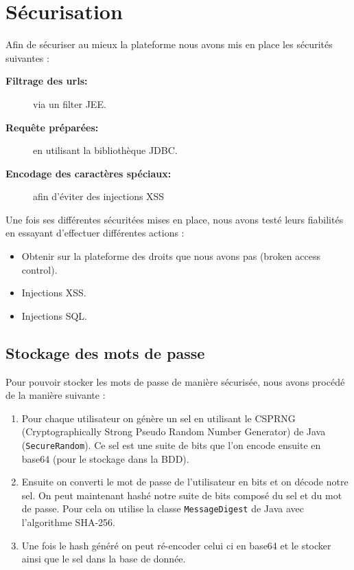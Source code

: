\section{Sécurisation}

Afin de sécuriser au mieux la plateforme nous avons mis en place les sécurités suivantes :
\begin{description}
    \item[\textbf{Filtrage des urls:}] via un filter JEE.
    \item[\textbf{Requête préparées:}] en utilisant la bibliothèque JDBC.
    \item[\textbf{Encodage des caractères spéciaux:}] afin d'éviter des injections XSS
\end{description}
\medskip

Une fois ses différentes sécuritées mises en place, nous avons testé leurs fiabilités en essayant
d'effectuer différentes actions :
\begin{itemize}
    \item Obtenir sur la plateforme des droits que nous avons pas (broken access control).
    \item Injections XSS.
    \item Injections SQL.
\end{itemize}
\newpage

\subsection{Stockage des mots de passe}

Pour pouvoir stocker les mots de passe de manière sécurisée, nous avons procédé de la manière
suivante :
\begin{enumerate}
    \item Pour chaque utilisateur on génère un sel en utilisant le CSPRNG (Cryptographically Strong
        Pseudo Random Number Generator) de Java (\verb:SecureRandom:). Ce sel est une suite de
        bits que l'on encode ensuite en base64 (pour le stockage dans la BDD).

    \item Ensuite on converti le mot de passe de l'utilisateur en bits et on décode notre sel. On
        peut maintenant hashé notre suite de bits composé du sel et du mot de passe. Pour cela on
        utilise la classe \verb:MessageDigest: de Java avec l'algorithme SHA-256.

    \item Une fois le hash généré on peut ré-encoder celui ci en base64 et le stocker ainsi que le
        sel dans la base de donnée.
\end{enumerate}

